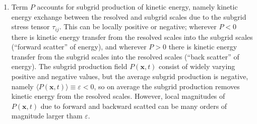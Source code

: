 \begin{enumerate}
    \item Term $P$ accounts for subgrid production of kinetic energy,
        namely kinetic energy exchange between the resolved and subgrid
        scales due to the subgrid stress tensor $\tau_{ij}$. This can be
        locally positive or negative; wherever $P<0$ there is kinetic
        energy transfer from the resolved scales into the subgrid scales
        (``forward scatter'' of energy), and wherever $P>0$ there is
        kinetic energy transfer from the subgrid scales into the resolved
        scales (``back scatter'' of energy). The subgrid production field
        $P(\mathbf{x}, t)$ consist of widely varying positive and negative
        values, but the average subgrid production is negative, namely
        $\langle P(\mathbf{x}, t) \rangle \equiv \varepsilon < 0$, so on
        average the subgrid production removes kinetic energy from the
        resolved scales. However, local magnitudes of $P(\mathbf{x}, t)$
        due to forward and backward scatted can be many orders of magnitude
        larger tham $\varepsilon$.
        
\end{enumerate}

